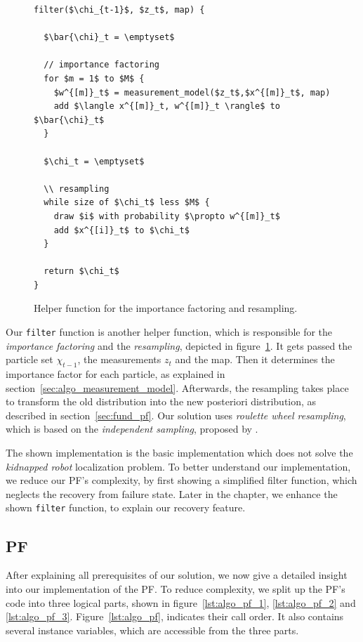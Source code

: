\begin{figure}
\begin{lstlisting}[mathescape]
filter($\chi_{t-1}$, $z_t$, map) {
  
  $\bar{\chi}_t = \emptyset$

  // importance factoring
  for $m = 1$ to $M$ {
    $w^{[m]}_t$ = measurement_model($z_t$,$x^{[m]}_t$, map)
    add $\langle x^{[m]}_t, w^{[m]}_t \rangle$ to $\bar{\chi}_t$
  }
  
  $\chi_t = \emptyset$
  
  \\ resampling
  while size of $\chi_t$ less $M$ {
    draw $i$ with probability $\propto w^{[m]}_t$
    add $x^{[i]}_t$ to $\chi_t$
  }
  
  return $\chi_t$
}		
\end{lstlisting}
\caption{Helper function for the importance factoring and resampling.}
\label{lst:pf_filter}
\end{figure}

Our \texttt{filter} function is another helper function, which is responsible for the \emph{importance factoring} and the \emph{resampling}, depicted in figure~\ref{lst:pf_filter}. It gets passed the particle set $\chi_{t-1}$, the measurements $z_t$ and the map. Then it determines the importance factor for each particle, as explained in section~\ref{sec:algo_measurement_model}. Afterwards, the resampling takes place to transform the old distribution into the new posteriori distribution, as described in section~\ref{sec:fund_pf}. Our solution uses \emph{roulette wheel resampling}, which is based on the \emph{independent sampling}, proposed by \citet[p. 108--111]{thrun:prob_robo}.

 The shown implementation is the basic implementation which does not solve the \emph{kidnapped robot} localization problem. To better understand our implementation, we reduce our \acs{PF}'s complexity, by first showing a simplified filter function, which neglects the recovery from failure state. Later in the chapter, we enhance the shown \texttt{filter} function, to explain our recovery feature. 

\subsection{\acl{PF}}
After explaining all prerequisites of our solution, we now give a detailed insight into our implementation of the \acl{PF}. To reduce complexity, we split up the \acs{PF}'s code into three logical parts, shown in figure~\ref{lst:algo_pf_1}, \ref{lst:algo_pf_2} and \ref{lst:algo_pf_3}. Figure~\ref{lst:algo_pf}, indicates their call order. It also contains several instance variables, which are accessible from the three parts.


